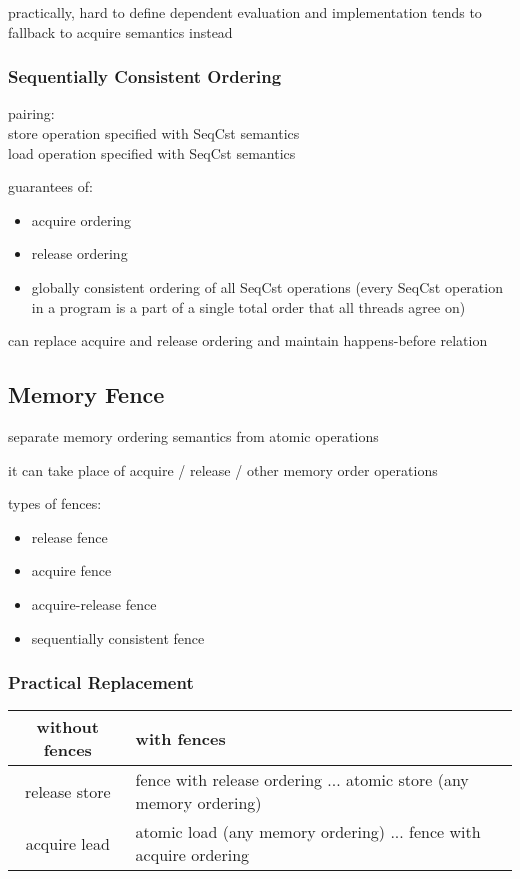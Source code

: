 \documentclass[8pt]{extarticle}
\begin{document}
\begin{multicols*}{2}
    practically, hard to define dependent evaluation and implementation tends to fallback to acquire semantics instead
    
    \subsubsection{Sequentially Consistent Ordering}

    pairing:\\
    store operation specified with SeqCst semantics\\
    load operation specified with SeqCst semantics

    guarantees of:
    \begin{itemize}
    \item acquire ordering
    \item release ordering
    \item globally consistent ordering of all SeqCst operations (every SeqCst operation in a program is a part of a single total order that all threads agree on)
    \end{itemize}

    can replace acquire and release ordering and maintain happens-before relation
    
    \subsection{Memory Fence}

    separate memory ordering semantics from atomic operations

    it can take place of acquire / release / other memory order operations

    types of fences:
    \begin{itemize}
    \item release fence
    \item acquire fence
    \item acquire-release fence
    \item sequentially consistent fence
    \end{itemize}
      
    \subsubsection{Practical Replacement}
    
    \begin{tabular}{| c | p{50mm} |}
    \hline
    \textbf{without fences} & \textbf{with fences} \\
    \hline
    release store & fence with release ordering \newline ... \newline atomic store (any memory ordering) \\
    \hline
    acquire lead & atomic load (any memory ordering) \newline ... \newline fence with acquire ordering \\
    \hline
    \end{tabular}


\end{multicols*}
\end{document}
